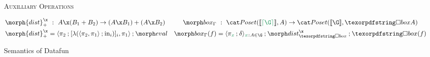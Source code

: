 \begin{figure*}
  \textsc{Auxilliary Operations}

  \begin{align*}
    \morph{dist}^\x_+ &~:~ A \x (B_1 + B_2) \to (A \x B_1) + (A \x B_2)
    &
    \mkbox_\Gamma &~:~ \Poset(\den{\stripcx \G}, A) \to \Poset(\den{\G}, \iso A) \\
    \morph{dist}^\x_+ &= \fork{\pi_2 \then \krof{\lambda (\fork{\pi_2,\pi_1} \then \injc_i)}_i, \pi_1}
    \then \eval
    &
    \mkbox_\Gamma(f) &= \fork{\pi_{\dvar x} \then \delta}_{\hd x A \in \G} \then \isox \then \iso(f)
  \end{align*}

  \caption{Semantics of Datafun}
  \label{fig:semantics}\label{def:strip}
\end{figure*}
